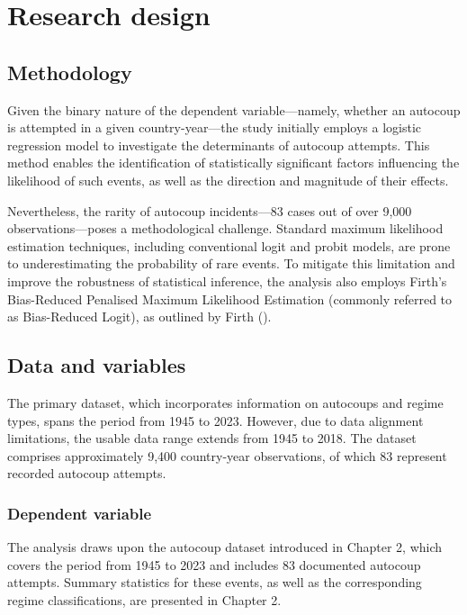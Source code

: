 \documentclass[
  12pt,
]{report}
\begin{document}
\section{Research design}\label{research-design}

\subsection*{Methodology}\label{methodology}

Given the binary nature of the dependent variable---namely, whether an
autocoup is attempted in a given country-year---the study initially
employs a logistic regression model to investigate the determinants of
autocoup attempts. This method enables the identification of
statistically significant factors influencing the likelihood of such
events, as well as the direction and magnitude of their effects.

Nevertheless, the rarity of autocoup incidents---83 cases out of over
9,000 observations---poses a methodological challenge. Standard maximum
likelihood estimation techniques, including conventional logit and
probit models, are prone to underestimating the probability of rare
events. To mitigate this limitation and improve the robustness of
statistical inference, the analysis also employs Firth's Bias-Reduced
Penalised Maximum Likelihood Estimation (commonly referred to as
Bias-Reduced Logit), as outlined by Firth
().

\subsection*{Data and variables}\label{data-and-variables}

The primary dataset, which incorporates information on autocoups and
regime types, spans the period from 1945 to 2023. However, due to data
alignment limitations, the usable data range extends from 1945 to 2018.
The dataset comprises approximately 9,400 country-year observations, of
which 83 represent recorded autocoup attempts.

\subsubsection*{Dependent variable}\label{dependent-variable}

The analysis draws upon the autocoup dataset introduced in Chapter 2,
which covers the period from 1945 to 2023 and includes 83 documented
autocoup attempts. Summary statistics for these events, as well as the
corresponding regime classifications, are presented in Chapter 2.
\end{document}
